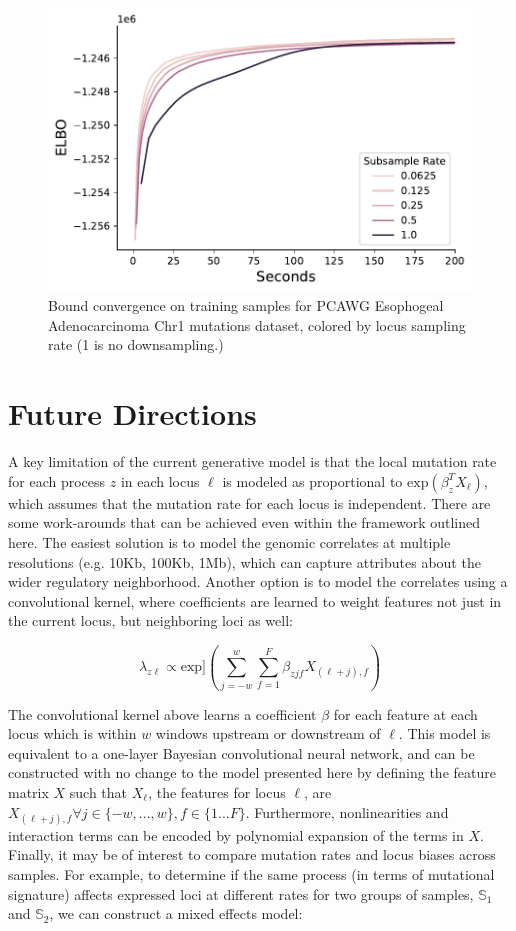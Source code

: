 \documentclass{article}
\begin{document}
\begin{figure}[!htb] \label{svi_fig}
\caption{Bound convergence on training samples for PCAWG Esophogeal Adenocarcinoma Chr1 mutations dataset, colored by locus sampling rate (1 is no downsampling.)}
\centering
\includegraphics[scale=0.5]{svi_subsampling.pdf}
\end{figure}

\section{Future Directions}

A key limitation of the current generative model is that the local mutation rate for each process $z$ in each locus $\ell$ is modeled as proportional to $\textrm{exp}(\beta_z^T X_\ell)$, which assumes that the mutation rate for each locus is independent. There are some work-arounds that can be achieved even within the framework outlined here. The easiest solution is to model the genomic correlates at multiple resolutions (e.g. 10Kb, 100Kb, 1Mb), which can capture attributes about the wider regulatory neighborhood. Another option is to model the correlates using a convolutional kernel, where coefficients are learned to weight features not just in the current locus, but neighboring loci as well:

\begin{equation}
\lambda_{z\ell} \propto \textrm{exp}] \left( \sum_{j=-w}^w \sum_{f=1}^F \beta_{zjf} X_{(\ell+j),f} \right)
\end{equation}

The convolutional kernel above learns a coefficient $\beta$ for each feature at each locus which is within $w$ windows upstream or downstream of $\ell$. This model is equivalent to a one-layer Bayesian convolutional neural network, and can be constructed with no change to the model presented here by defining the feature matrix $X$ such that $X_\ell$, the features for locus $\ell$, are $X_{(\ell+j),f}\forall j\in\{-w, ..., w\}, f \in \{1...F\}$. Furthermore, nonlinearities and interaction terms can be encoded by polynomial expansion of the terms in $X$. Finally, it may be of interest to compare mutation rates and locus biases across samples. For example, to determine if the same process (in terms of mutational signature) affects expressed loci at different rates for two groups of samples, $\mathbb{S}_1$ and $\mathbb{S}_2$, we can construct a mixed effects model:
\end{document}
